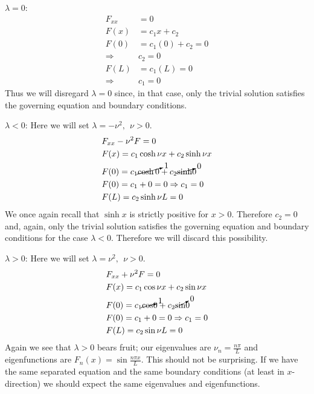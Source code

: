 \vspace{0.25cm}

\noindent\underline{$\lambda = 0$}:
\begin{align*}
F_{xx} &= 0 \\
F(x) &= c_1x + c_2 \\
F(0) &= c_1(0) + c_2 = 0 \\
\Rightarrow & c_2 = 0 \\
F(L) &= c_1(L) = 0 \\
\Rightarrow & c_1 = 0
\end{align*}
Thus we will disregard $\lambda = 0$ since, in that case, only the trivial solution satisfies the governing equation and boundary conditions.

\vspace{0.25cm}

\noindent\underline{$\lambda < 0$}:  Here we will set $\lambda = -\nu^2, \ \ \nu>0$. 
\begin{align*}
&F_{xx} - \nu^2 F = 0 \\
&F(x) = c_1 \cosh{\nu x} + c_2 \sinh{\nu x} \\
&F(0) = c_1 \cancelto{1}{\cosh{0}} + c_2 \cancelto{0}\sinh{0} \\
&F(0) = c_1 + 0 = 0 \Rightarrow c_1 = 0 \\
&F(L) = c_2 \sinh{\nu L} = 0 \\
\end{align*}
We once again recall that $\sinh{x}$ is strictly positive for $x>0$.  Therefore $c_2 = 0$ and, again, only the trivial solution satisfies the governing equation and boundary conditions for the case $\lambda < 0$.  Therefore we will discard this possibility.

\vspace{0.25cm}

\noindent\underline{$\lambda > 0$}:  Here we will set $\lambda = \nu^2, \ \ \nu>0$.
\begin{align*}
&F_{xx} + \nu^2 F = 0 \\
&F(x) = c_1 \cos{\nu x} + c_2 \sin{\nu x} \\
&F(0) = c_1 \cancelto{1}\cos{0} + c_2 \cancelto{0}\sin{0} \\
&F(0) = c_1 + 0 = 0 \Rightarrow c_1 = 0 \\
&F(L) = c_2 \sin{\nu L} = 0
\end{align*}
Again we see that $\lambda > 0$ bears fruit; our eigenvalues are $\nu_n = \frac{n \pi}{L}$ and eigenfunctions are $F_n(x) = \sin{\frac{n \pi x}{L}}$.  This should not be surprising.  If we have the same separated equation and the same boundary conditions (at least in $x$-direction) we should expect the same eigenvalues and eigenfunctions.

